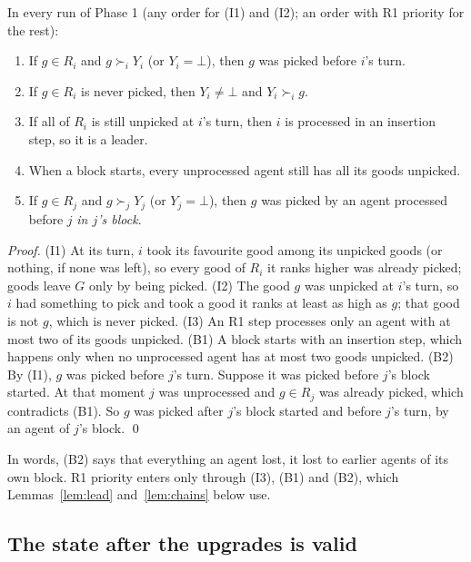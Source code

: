 \documentclass[runningheads,11pt]{llncs}
\newcommand{\none}{\bot}
\begin{document}
\begin{lemma}[Phase 1]\label{lem:inv}
In every run of Phase 1 (any order for (I1) and (I2); an order with R1 priority for the rest):
\begin{enumerate}
\item[(I1)] If $g\in R_i$ and $g\succ_i Y_i$ (or $Y_i=\none$), then $g$ was picked before $i$'s turn.
\item[(I2)] If $g\in R_i$ is never picked, then $Y_i\ne\none$ and $Y_i\succ_i g$.
\item[(I3)] If all of $R_i$ is still unpicked at $i$'s turn, then $i$ is processed in an insertion step, so it is a leader.
\item[(B1)] When a block starts, every unprocessed agent still has all its goods unpicked.
\item[(B2)] If $g\in R_j$ and $g\succ_j Y_j$ (or $Y_j=\none$), then $g$ was picked by an agent processed before $j$ \emph{in $j$'s block}.
\end{enumerate}
\end{lemma}

\begin{proof}
(I1) At its turn, $i$ took its favourite good among its unpicked goods (or nothing, if none was left), so every good of $R_i$ it ranks higher was already picked; goods leave $G$ only by being picked.
(I2) The good $g$ was unpicked at $i$'s turn, so $i$ had something to pick and took a good it ranks at least as high as $g$; that good is not $g$, which is never picked.
(I3) An R1 step processes only an agent with at most two of its goods unpicked.
(B1) A block starts with an insertion step, which happens only when no unprocessed agent has at most two goods unpicked.
(B2) By (I1), $g$ was picked before $j$'s turn. Suppose it was picked before $j$'s block started. At that moment $j$ was unprocessed and $g\in R_j$ was already picked, which contradicts (B1). So $g$ was picked after $j$'s block started and before $j$'s turn, by an agent of $j$'s block. \qed
\end{proof}

\noindent In words, (B2) says that everything an agent lost, it lost to earlier agents of its own block. R1 priority enters only through (I3), (B1) and (B2), which Lemmas~\ref{lem:lead} and~\ref{lem:chains} below use.

\subsection{The state after the upgrades is valid}\label{sec:valid}
\end{document}
